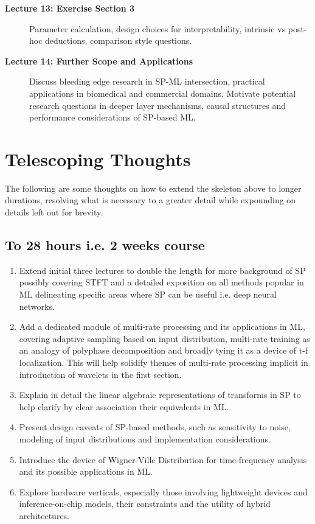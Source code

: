 \documentclass[12pt]{article}
\begin{document}
\begin{description}
    \item[\textbf{Lecture 13: Exercise Section 3}] 
    Parameter calculation, design choices for interpretability, intrinsic vs post-hoc deductions, comparison style questions.    

    \item[\textbf{Lecture 14: Further Scope and Applications}] 
    Discuss bleeding edge research in SP-ML intersection, practical applications in biomedical and commercial domains. Motivate potential research questions in deeper layer mechanisms, causal structures and performance considerations of SP-based ML.
\end{description}

\section{Telescoping Thoughts}
The following are some thoughts on how to extend the skeleton above to longer durations, resolving what is necessary to a greater detail while expounding on details left out for brevity.
\subsection{To 28 hours i.e. 2 weeks course}
\begin{enumerate}
    \item Extend initial three lectures to double the length for more background of SP possibly covering STFT and a detailed exposition on all methods popular in ML delineating specific areas where SP can be useful i.e. deep neural networks.
    \item Add a dedicated module of multi-rate processing and its applications in ML, covering adaptive sampling based on input distribution, multi-rate training as an analogy of polyphase decomposition \cite{6} and broadly tying it as a device of t-f localization. This will help solidify themes of multi-rate processing implicit in introduction of wavelets in the first section.
    \item Explain in detail the linear algebraic representations of transforms in SP to help clarify by clear association their equivalents in ML. 
    \item Present design caveats of SP-based methods, such as sensitivity to noise, modeling of input distributions and implementation considerations.
    \item Introduce the device of Wigner-Ville Distribution for time-frequency analysis and its possible applications in ML.
    \item Explore hardware verticals, especially those involving lightweight devices and inference-on-chip models, their constraints and the utility of hybrid architectures.
\end{enumerate}
\end{document}
